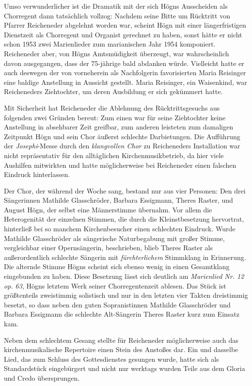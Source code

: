 \documentclass{book}
\newcommand{\zitat}[1]{\textit{#1}}
\begin{document}
Umso verwunderlicher ist die Dramatik mit der sich Högns Ausscheiden als
Chorregent dann tatsächlich vollzog: Nachdem seine Bitte um Rücktritt
von Pfarrer Reicheneder abgelehnt worden war, scheint Högn mit einer
län\-gerfristigen Dienstzeit als Chorregent und Organist gerechnet zu
haben, sonst hätte er nicht schon 1953 zwei Marienlieder zum
marianischen Jahr 1954 komponiert. Reicheneder aber, von Högns
Amtsmüdigkeit überzeugt, war wahrscheinlich davon ausgegangen, dass der
75-jährige bald abdanken würde. Vielleicht hatte er auch deswegen der
von vorneherein als Nachfolgerin favo\-risierten Maria Reisinger eine
baldige Anstellung in Aussicht gestellt. Maria Reisinger, ein
Waisenkind, war Reicheneders Ziehtochter, um deren Ausbil\-dung er sich
gekümmert hatte. 

Mit Sicherheit hat Reicheneder die Ablehnung des Rücktrittsgesuchs aus
folgenden zwei Gründen bereut: Zum einen war für seine Ziehtochter
keine Anstellung in absehbarer Zeit greifbar, zum anderen leisteten zum
damaligen Zeitpunkt Högn und sein Chor äußerst schlechte Darbietungen.
Die Auffüh\-rung der \textit{Josephi}{}-Messe durch den
\zitat{klangvollen Chor} zu Reicheneders Installation war
nicht repräsentativ für den alltäglichen Kirchenmusikbetrieb, da hier
viele Aushilfen mitwirkten und hatte möglicherweise bei Reicheneder
einen fal\-schen Eindruck hinterlassen.

Der Chor, der während der Woche sang, bestand nur aus vier Personen: Den
drei Sängerinnen Mathilde Glasschröder, Barbara Essigmann, Theres
Raster, und August Högn, der selbst eine Männerstimme übernahm. Vor
al\-lem die Heterogenität der einzelnen Stimmen, die durch die
Kleinstbesetzung hervortrat, hinterließ bei so manchem Kirchenbesucher
einen schlechten Eindruck. Wurde Mathilde Glasschröder als sängerische
Naturbegabung mit großer Stimme, vergleichbar einer Opernsängerin,
beschrieben, blieb Theres Raster als außerordentlich schlechte Sängerin
mit \textit{fürchterlichem} Stimmklang in Erinnerung. Die alternde
Stimme Högns scheint sich ebenso wenig in einen Gesamtklang eingebunden
zu haben. Diese Besetzung lässt sich deutlich am \textit{Marienlied Nr.
12 op. 63}, Högns letztem Werk seiner Chorregentenzeit ablesen. Das
Stück ist größtenteils zweistimmig solistisch und nur in den letzten
vier Takten dreistimmig besetzt, so dass neben den guten Sopranistinnen
Mathilde Glasschröder und Barbara Essigmann die schlechte Alt-Sängerin
Theres Raster kurz zum Einsatz kam. 

Neben dem schlechtem Gesang stellte für Reicheneder möglicherweise auch
das kirchenmusikalische Repertoire einen Stein des Anstoßes dar. Ein
und dasselbe Lied, das zum Schluss des Gottesdienstes gesungen wurde,
hatte sich als Standardstück eingebürgert und nicht nur werktags wurden
Teile aus dem Gloria und Credo übersprungen.
\end{document}
